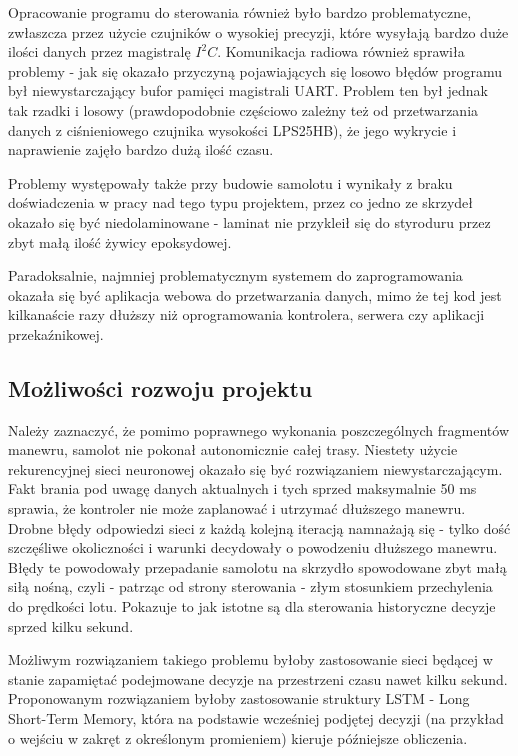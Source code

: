 \documentclass[12pt, a4paper]{article}
\begin{document}
Opracowanie programu do sterowania również było bardzo problematyczne, zwłaszcza przez użycie czujników o wysokiej precyzji, które wysyłają bardzo duże ilości danych przez magistralę $I^2C$. Komunikacja radiowa również sprawiła problemy - jak się okazało przyczyną pojawiających się losowo błędów programu był niewystarczający bufor pamięci magistrali UART. Problem ten był jednak tak rzadki i losowy (prawdopodobnie częściowo zależny też od przetwarzania danych z ciśnieniowego czujnika wysokości LPS25HB), że jego wykrycie i naprawienie zajęło bardzo dużą ilość czasu.

Problemy występowały także przy budowie samolotu i wynikały z braku doświadczenia w pracy nad tego typu projektem, przez co jedno ze skrzydeł okazało się być niedolaminowane - laminat nie przykleił się do styroduru przez zbyt małą ilość żywicy epoksydowej.

Paradoksalnie, najmniej problematycznym systemem do zaprogramowania okazała się być aplikacja webowa do przetwarzania danych, mimo że tej kod jest kilkanaście razy dłuższy niż oprogramowania kontrolera, serwera czy aplikacji przekaźnikowej.

\subsection{Możliwości rozwoju projektu}

Należy zaznaczyć, że pomimo poprawnego wykonania poszczególnych fragmentów manewru, samolot nie pokonał autonomicznie całej trasy. Niestety użycie rekurencyjnej sieci neuronowej okazało się być rozwiązaniem niewystarczającym. Fakt brania pod uwagę danych aktualnych i tych sprzed maksymalnie 50 ms sprawia, że kontroler nie może zaplanować i utrzymać dłuższego manewru. Drobne błędy odpowiedzi sieci z każdą kolejną iteracją namnażają się - tylko dość szczęśliwe okoliczności i warunki decydowały o powodzeniu dłuższego manewru. Błędy te powodowały przepadanie samolotu na skrzydło spowodowane zbyt małą siłą nośną, czyli - patrząc od strony sterowania - złym stosunkiem przechylenia do prędkości lotu. Pokazuje to jak istotne są dla sterowania historyczne decyzje sprzed kilku sekund.

Możliwym rozwiązaniem takiego problemu byłoby zastosowanie sieci będącej w stanie zapamiętać podejmowane decyzje na przestrzeni czasu nawet kilku sekund. Proponowanym rozwiązaniem byłoby zastosowanie struktury LSTM - Long Short-Term Memory, która na podstawie wcześniej podjętej decyzji (na przykład o wejściu w zakręt z określonym promieniem) kieruje późniejsze obliczenia.
\end{document}
